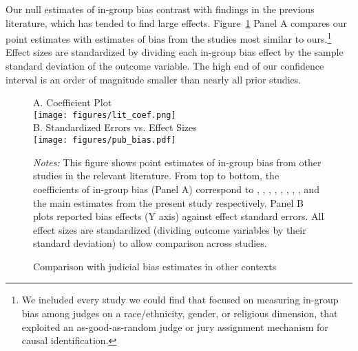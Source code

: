 \documentclass[12pt,english]{article}
\begin{document}
Our null estimates of in-group bias contrast with findings in the previous literature, which has tended to find large effects. Figure~\ref{fig:literature} Panel A compares our point estimates with estimates of bias from the studies most similar to ours.\footnote{We included every study we could find that focused on measuring in-group bias among judges on a race/ethnicity, gender, or religious dimension, that exploited an as-good-as-random judge or jury assignment mechanism for causal identification.} Effect sizes are standardized by dividing each in-group bias effect by the sample standard deviation of the outcome variable. The high end of our confidence interval is an order of magnitude smaller than nearly all prior studies.

\begin{figure}%
  \begin{center}
    \caption{Comparison with judicial bias estimates in other contexts}
    \label{fig:literature}
    A. Coefficient Plot \\ 
    \texttt{[image: figures/lit\_coef.png]} \\ 
    \vspace{1cm}
    B. Standardized Errors vs. Effect Sizes \\ 
    \texttt{[image: figures/pub\_bias.pdf]} \\
  \end{center}
   \begin{minipage}{1.0\textwidth}
   \footnotesize \emph{Notes:} This figure shows point estimates of in-group bias from other studies in the relevant literature. From top to bottom, the coefficients of in-group bias (Panel A) correspond to \cite{ShayoZussman2011QJE}, \cite{AnwarBayerHjalmarsson2012TQJoE}, 
    \cite{depew2017judges},
   \cite{knepper2018shadow}, \cite{sloane2019racial}, \cite{Didwania2018CLE}, \cite{lim2016judges}, 
   \cite{gazal2010let}, and the main estimates from the present study respectively. Panel B plots reported bias effects (Y axis) against effect standard errors. All effect sizes are standardized (dividing outcome variables by their standard deviation) to allow comparison across studies.
   \par 
   \end{minipage}
\end{figure}
\end{document}
